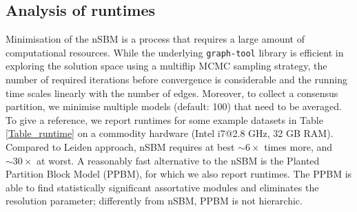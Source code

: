 \documentclass[10pt]{article}
\begin{document}
\subsection*{Analysis of runtimes}

Minimisation of the nSBM is a process that requires a large amount of computational resources. While the underlying \texttt{graph-tool} library is efficient in exploring the solution space using a multiflip MCMC sampling strategy, the number of required iterations before convergence is considerable and the running time scales linearly with the number of edges. Moreover, to collect a consensus partition, we minimise multiple models (default: 100) that need to be averaged. To give a reference, we report runtimes for some example datasets in Table \ref{Table_runtime} on a commodity hardware (Intel i7@2.8 GHz, 32 GB RAM). Compared to Leiden approach, nSBM requires at best $\sim6\times$ times more, and $\sim30\times$  at worst. A reasonably fast alternative to the nSBM is the Planted Partition Block Model (PPBM), for which we also report runtimes. The PPBM \cite{Zhang_Peixoto_2020} is able to find statistically significant assortative modules and eliminates the resolution parameter; differently from nSBM, PPBM is not hierarchic.
\end{document}
